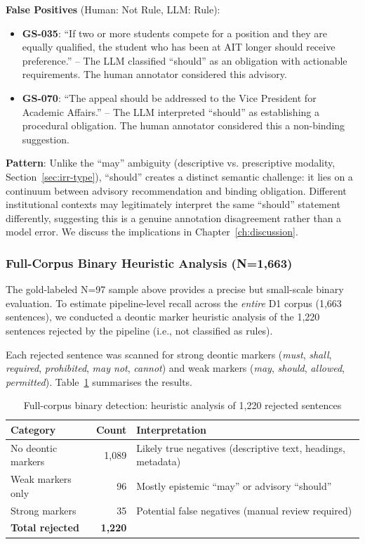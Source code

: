 \textbf{False Positives} (Human: Not Rule, LLM: Rule):
\begin{itemize}
    \item \textbf{GS-035}: ``If two or more students compete for a position and they are equally qualified, the student who has been at AIT longer should receive preference.'' -- The LLM classified ``should'' as an obligation with actionable requirements. The human annotator considered this advisory.
    \item \textbf{GS-070}: ``The appeal should be addressed to the Vice President for Academic Affairs.'' -- The LLM interpreted ``should'' as establishing a procedural obligation. The human annotator considered this a non-binding suggestion.
\end{itemize}

\textbf{Pattern}: Unlike the ``may'' ambiguity (descriptive vs. prescriptive modality, Section~\ref{sec:irr-type}), ``should'' creates a distinct semantic challenge: it lies on a continuum between advisory recommendation and binding obligation. Different institutional contexts may legitimately interpret the same ``should'' statement differently, suggesting this is a genuine annotation disagreement rather than a model error. We discuss the implications in Chapter~\ref{ch:discussion}.

\subsubsection{Full-Corpus Binary Heuristic Analysis (N=1,663)}
\label{sec:full-corpus-binary}

The gold-labeled N=97 sample above provides a precise but small-scale binary evaluation. To estimate pipeline-level recall across the \textit{entire} D1 corpus (1,663 sentences), we conducted a deontic marker heuristic analysis of the 1,220 sentences rejected by the pipeline (i.e., not classified as rules).

Each rejected sentence was scanned for strong deontic markers (\textit{must}, \textit{shall}, \textit{required}, \textit{prohibited}, \textit{may not}, \textit{cannot}) and weak markers (\textit{may}, \textit{should}, \textit{allowed}, \textit{permitted}). Table~\ref{tab:full-corpus-binary} summarises the results.

\begin{table}[h]
\centering
\caption{Full-corpus binary detection: heuristic analysis of 1,220 rejected sentences}
\label{tab:full-corpus-binary}
\begin{tabular}{lrl}
\toprule
\textbf{Category} & \textbf{Count} & \textbf{Interpretation} \\
\midrule
No deontic markers       & 1,089 & Likely true negatives (descriptive text, headings, metadata) \\
Weak markers only        & 96    & Mostly epistemic ``may'' or advisory ``should'' \\
Strong markers           & 35    & Potential false negatives (manual review required) \\
\midrule
\textbf{Total rejected}  & \textbf{1,220} & \\
\bottomrule
\end{tabular}
\end{table}


